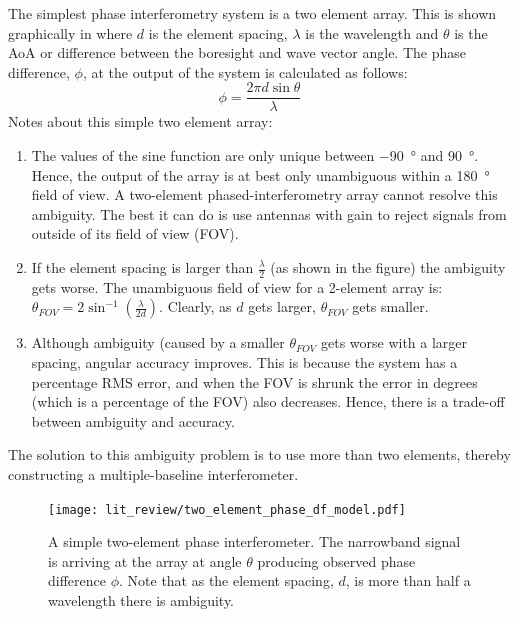 The simplest phase interferometry system is a two element array. This is shown graphically in  where \(d\) is the element spacing, \(\lambda\) is the wavelength and \(\theta\) is the AoA or difference between the boresight and wave vector angle. The phase difference, \(\phi\), at the output of the system is calculated as follows:
\begin{equation}
\phi = \frac{2 \pi d \sin \theta}{\lambda}
\end{equation}
Notes about this simple two element array:
\begin{enumerate}
  \item The values of the sine function are only unique between \SI{-90}{\degree} and \SI{90}{\degree}. Hence, the output of the array is at best only unambiguous within a \SI{180}{\degree} field of view. A two-element phased-interferometry array cannot resolve this ambiguity. The best it can do is use antennas with gain to reject signals from outside of its field of view (FOV).
  \item If the element spacing is larger than \(\frac{\lambda}{2}\) (as shown in the figure) the ambiguity gets worse. The unambiguous field of view for a 2-element array is: \(\theta_{FOV} = 2 \sin^{-1}(\frac{\lambda}{2d})\)\cite{poisel2012electronic}. Clearly, as \(d\) gets larger, \(\theta_{FOV}\) gets smaller. 
  \item Although ambiguity (caused by a smaller \(\theta_{FOV}\) gets worse with a larger spacing, angular accuracy improves. This is because the system has a percentage RMS error, and when the FOV is shrunk the error in degrees (which is a percentage of the FOV) also decreases. Hence, there is a trade-off between ambiguity and accuracy.
\end{enumerate}
The solution to this ambiguity problem is to use more than two elements, thereby constructing a multiple-baseline interferometer. 

\begin{figure}
   \centering
   \texttt{[image: lit\_review/two\_element\_phase\_df\_model.pdf]}
   \caption{A simple two-element phase interferometer. The narrowband signal is arriving at the array at angle \(\theta\) producing observed phase difference \(\phi\). Note that as the element spacing, \(d\), is more than half a wavelength there is ambiguity.}
   \label{fig:lit-two-element-phase}
\end{figure}


